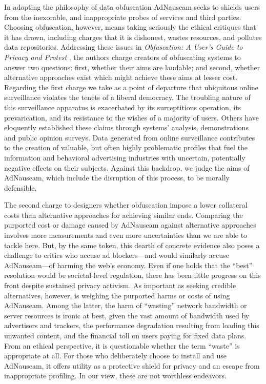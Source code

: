 \documentclass[conference]{IEEEtran}
\begin{document}
In adopting the philosophy of data obfuscation AdNauseam seeks to shields users from the inexorable, and inappropriate probes of services and third parties. Choosing obfuscation, however, means taking seriously the ethical critiques that it has drawn, including charges that it is dishonest, wastes resources, and pollutes data repositories. Addressing these issues in \emph{Obfuscation: A User's Guide to Privacy and Protest} \cite{Brunton}, the authors charge creators of obfuscating systems to answer two questions: first, whether their aims are laudable; and second, whether alternative approaches exist which might achieve these aims at lesser cost. Regarding the first charge we take as a point of departure that ubiquitous online surveillance violates the tenets of a liberal democracy. The troubling nature of this surveillance apparatus is exacerbated by its surreptitious operation, its prevarication, and its resistance to the wishes of a majority of users. Others have eloquently established these claims through systems' analysis, demonstrations and public opinion surveys. \cite{Turow, Goldfarb, Tucker} Data generated from online surveillance contributes to the creation of valuable, but often highly problematic profiles that fuel the information and behavioral advertising industries with uncertain, potentially negative effects on their subjects. Against this backdrop, we judge the aims of AdNauseam, which include the disruption of this process, to be morally defensible.

The second charge to designers whether obfuscation impose a lower collateral costs than alternative approaches for achieving similar ends. Comparing the purported cost or damage caused by AdNauseam against alternative approaches involves more measurements and even more uncertainties than we are able to tackle here. But, by the same token, this dearth of concrete evidence also poses a challenge to critics who accuse ad blockers---and would similarly accuse AdNauseam---of harming the web's economy. Even if one holds that the “best” resolution would be societal-level regulation, there has been little progress on this front despite sustained privacy activism. As important as seeking credible alternatives, however, is weighing the purported harms or costs of using AdNauseam. Among the latter, the harm of “wasting” network bandwidth or server resources is ironic at best, given the vast amount of bandwidth used by advertisers and trackers, the performance degradation resulting from loading this unwanted content, and the financial toll on users paying for fixed data plans. From an ethical perspective, it is questionable whether the term “waste” is appropriate at all. For those who deliberately choose to install and use AdNauseam, it offers utility as a protective shield for privacy and an escape from inappropriate profiling. In our view, these are not worthless endeavors.
\end{document}

